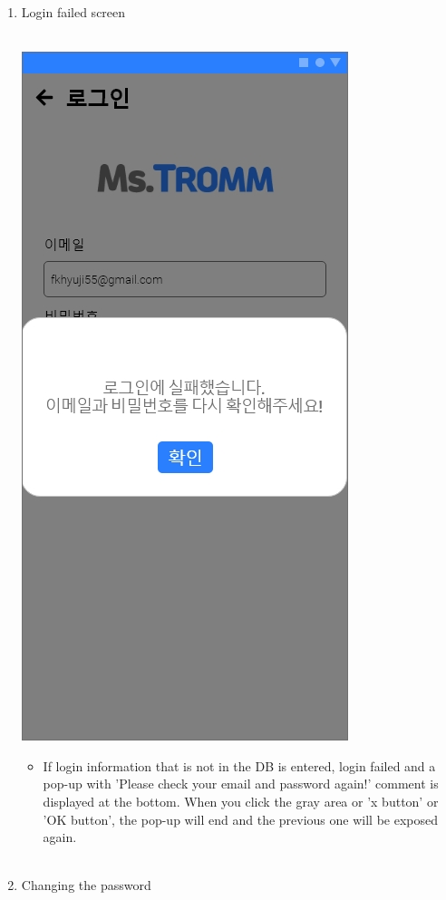\documentclass[conference]{IEEEtran}
\begin{document}
\begin{enumerate}
    \item Login failed screen \\\\
    \centerline{\includegraphics[scale=0.32]{assets/로그인2.jpg}}
    \begin{itemize}
    \item[] If login information that is not in the DB is entered, login failed and a pop-up with 'Please check your email and password again!' comment is displayed at the bottom. When you click the gray area or 'x button' or 'OK button', the pop-up will end and the previous one will be exposed again. \\ \\
    \end{itemize}
    \item Changing the password \\ \\

\end{enumerate}
\end{document}
